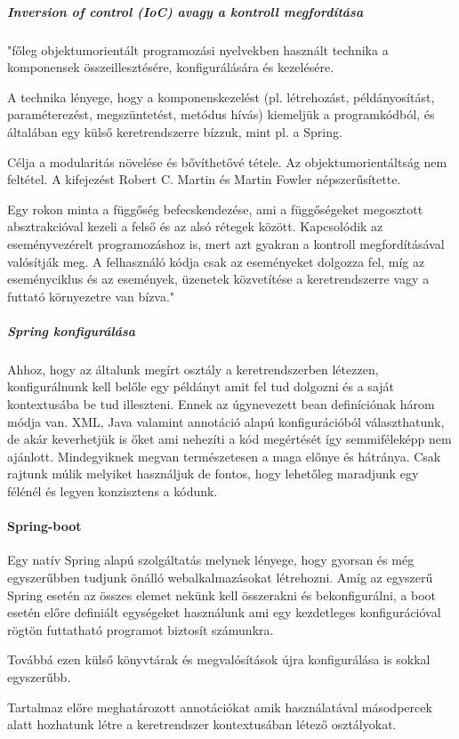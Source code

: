 \subparagraph{Inversion of control (IoC) avagy a kontroll megfordítása} "főleg objektumorientált programozási nyelvekben használt technika a komponensek összeillesztésére, konfigurálására és kezelésére.

A technika lényege, hogy a komponenskezelést (pl. létrehozást, példányosítást, paraméterezést, megszüntetést, metódus hívás) kiemeljük a programkódból, és általában egy külső keretrendszerre bízzuk, mint pl. a Spring.

Célja a modularitás növelése és bővíthetővé tétele. Az objektumorientáltság nem feltétel. A kifejezést Robert C. Martin és Martin Fowler népszerűsítette.

Egy rokon minta a függőség befecskendezése, ami a függőségeket megosztott absztrakcióval kezeli a felső és az alsó rétegek között. Kapcsolódik az eseményvezérelt programozáshoz is, mert azt gyakran a kontroll megfordításával valósítják meg. A felhasználó kódja csak az eseményeket dolgozza fel, míg az eseményciklus és az események, üzenetek közvetítése a keretrendszerre vagy a futtató környezetre van bízva."\cite{ioc}

\subparagraph{Spring konfigurálása}

Ahhoz, hogy az általunk megírt osztály a keretrendszerben létezzen, konfigurálnunk kell belőle egy példányt amit fel tud dolgozni és a saját kontextusába be tud illeszteni. Ennek az úgynevezett bean definíciónak három módja van. XML, Java valamint annotáció alapú konfigurációból választhatunk, de akár keverhetjük is őket ami nehezíti a kód megértését így semmiféleképp nem ajánlott. Mindegyiknek megvan természetesen a maga előnye és hátránya. Csak rajtunk múlik melyiket használjuk de fontos, hogy lehetőleg maradjunk egy félénél és legyen konzisztens a kódunk.

\paragraph{Spring-boot}

Egy natív Spring alapú szolgáltatás melynek lényege, hogy gyorsan és még egyszerűbben tudjunk önálló webalkalmazásokat létrehozni. Amíg az egyszerű Spring esetén az összes elemet nekünk kell összerakni és bekonfigurálni, a boot esetén előre definiált egységeket használunk ami egy kezdetleges konfigurációval rögtön futtatható programot biztosít számunkra.

Továbbá ezen külső könyvtárak és megvalósítások újra konfigurálása is sokkal egyszerűbb.

Tartalmaz előre meghatározott annotációkat amik használatával másodpercek alatt hozhatunk létre a keretrendszer kontextusában létező osztályokat.  

